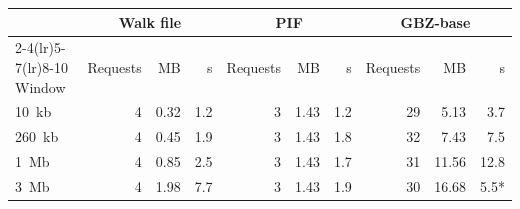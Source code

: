 \begin{tabular}{@{}lrrrrrrrrr@{}}
\toprule
& \multicolumn{3}{c}{Walk file} & \multicolumn{3}{c}{PIF} & \multicolumn{3}{c}{GBZ-base} \\
\cmidrule(lr){2-4}\cmidrule(lr){5-7}\cmidrule(lr){8-10}
Window & Requests & MB & s & Requests & MB & s & Requests & MB & s \\
\midrule
10~kb & 4 & 0.32 & 1.2 & 3 & 1.43 & 1.2 & 29 & 5.13 & 3.7 \\
260~kb & 4 & 0.45 & 1.9 & 3 & 1.43 & 1.8 & 32 & 7.43 & 7.5 \\
1~Mb & 4 & 0.85 & 2.5 & 3 & 1.43 & 1.7 & 31 & 11.56 & 12.8 \\
3~Mb & 4 & 1.98 & 7.7 & 3 & 1.43 & 1.9 & 30 & 16.68 & 5.5* \\
\bottomrule
\end{tabular}
